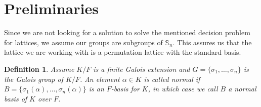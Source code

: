 \documentclass[12pt]{article}
\theoremstyle{plain}
\newtheorem{lemma}[theorem]{Lemma}
\newtheorem{definition}[theorem]{Definition}
\newcommand{\Z}{\ensuremath{\mathbb{Z}}}
\begin{document}
\section{Preliminaries}



Since we are not looking for a solution to solve the mentioned
decision problem for lattices, we assume our groups are subgroups of
$\mathbb{S}_n$. This assures us that the lattice we are working with
is a permutation lattice with the standard basis. 

\begin{definition}
  Assume $K/F$ is a finite Galois extension and $G = \lbrace \sigma_1,
  \ldots , \sigma_n \rbrace$ is the Galois group of $K/F$. An element
  $\alpha \in K$ is called normal if $B = \lbrace \sigma_1(\alpha),
  \ldots , \sigma_n(\alpha) \rbrace$ is an $F$-basis for $K$, in which
  case we call $B$ a normal basis of $K$ over $F$.
\end{definition} 
\end{document}
